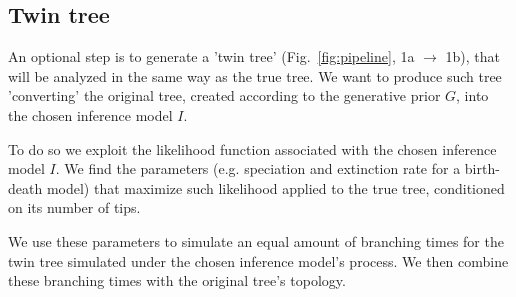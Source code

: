 \documentclass{article}
\begin{document}
\subsection{Twin tree}

\iffalse
An optional step is to generate a 'twin tree' 
(Fig.~\ref{fig:pipeline}, 1a $\rightarrow$ 1b),
that will be analyzed in the same way as the true tree. We want to produce such tree 'converting' the original tree, created according to the generative prior $\mathit{G}$, into the chosen inference model $\mathit{I}$.

To do so we exploit the likelihood function associated with the chosen inference model $\mathit{I}$. We find the parameters (e.g. speciation and extinction rate for a birth-death model) that maximize such likelihood applied to the true tree, conditioned on its number of tips.

We use these parameters to simulate an equal amount of branching times for the twin tree simulated under the chosen inference model's process. We then combine these branching times with the original tree's topology.
\end{document}
